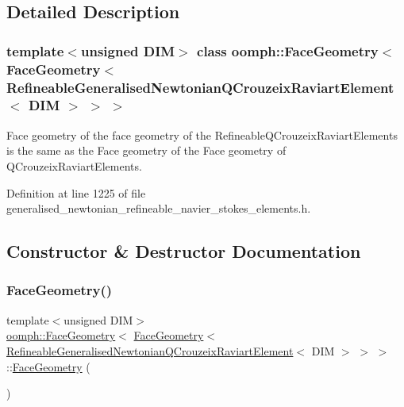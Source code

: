 \subsection{Detailed Description}
\subsubsection*{template$<$unsigned D\+IM$>$\newline
class oomph\+::\+Face\+Geometry$<$ Face\+Geometry$<$ Refineable\+Generalised\+Newtonian\+Q\+Crouzeix\+Raviart\+Element$<$ D\+I\+M $>$ $>$ $>$}

Face geometry of the face geometry of the Refineable\+Q\+Crouzeix\+Raviart\+Elements is the same as the Face geometry of the Face geometry of Q\+Crouzeix\+Raviart\+Elements. 

Definition at line 1225 of file generalised\+\_\+newtonian\+\_\+refineable\+\_\+navier\+\_\+stokes\+\_\+elements.\+h.



\subsection{Constructor \& Destructor Documentation}
\mbox{\label{classoomph_1_1FaceGeometry_3_01FaceGeometry_3_01RefineableGeneralisedNewtonianQCrouzeixRaviartElement_3_01DIM_01_4_01_4_01_4_a7ed622cc9aa9c54e7be87cf2fd3c4168}} 
\subsubsection{\texorpdfstring{Face\+Geometry()}{FaceGeometry()}}
{\footnotesize\ttfamily template$<$unsigned D\+IM$>$ \\
\hyperlink{classoomph_1_1FaceGeometry}{oomph\+::\+Face\+Geometry}$<$ \hyperlink{classoomph_1_1FaceGeometry}{Face\+Geometry}$<$ \hyperlink{classoomph_1_1RefineableGeneralisedNewtonianQCrouzeixRaviartElement}{Refineable\+Generalised\+Newtonian\+Q\+Crouzeix\+Raviart\+Element}$<$ D\+IM $>$ $>$ $>$\+::\hyperlink{classoomph_1_1FaceGeometry}{Face\+Geometry} (\begin{DoxyParamCaption}{ }\end{DoxyParamCaption})\hspace{0.3cm}{\ttfamily [inline]}}




